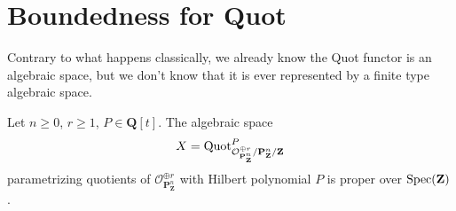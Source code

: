 




\section{Boundedness for Quot}
\label{section-quot-bounded}

\noindent
Contrary to what happens classically, we already know the Quot
functor is an algebraic space, but we don't know that it is
ever represented by a finite type algebraic space.

\begin{lemma}
\label{lemma-quot-Pn}
Let $n \geq 0$, $r \geq 1$, $P \in \mathbf{Q}[t]$.
The algebraic space
$$
X = \mathrm{Quot}^P_{\mathcal{O}^{\oplus r}_{\mathbf{P}^n_\mathbf{Z}}/
\mathbf{P}^n_\mathbf{Z}/\mathbf{Z}}
$$
parametrizing quotients of $\mathcal{O}_{\mathbf{P}^n_\mathbf{Z}}^{\oplus r}$
with Hilbert polynomial $P$ is proper over $\mathop{\mathrm{Spec}}(\mathbf{Z})$.
\end{lemma}

